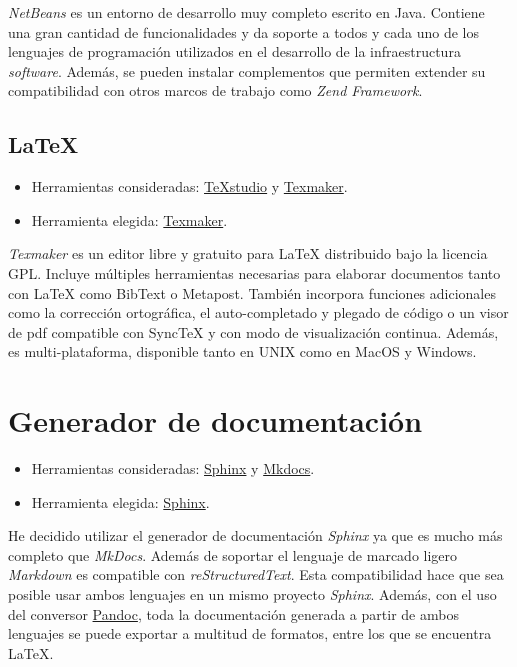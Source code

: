 \emph{NetBeans} es un entorno de desarrollo muy completo escrito en Java.
Contiene una gran cantidad de funcionalidades y da soporte a todos y
cada uno de los lenguajes de programación utilizados en el desarrollo de
la infraestructura \emph{software}. Además, se pueden instalar
complementos que permiten extender su compatibilidad con otros marcos de
trabajo como \emph{Zend Framework}.

\subsection{\LaTeX{}}

\begin{itemize}
\tightlist
\item
  Herramientas consideradas:
  \href{https://www.texstudio.org/}{TeXstudio} y
  \href{http://www.xm1math.net/texmaker/}{Texmaker}.
\item
  Herramienta elegida:
  \href{http://www.xm1math.net/texmaker/}{Texmaker}.
\end{itemize}

\emph{Texmaker} es un editor libre y gratuito para \LaTeX{} distribuido
bajo la licencia GPL. Incluye múltiples herramientas necesarias para
elaborar documentos tanto con \LaTeX{} como BibText o Metapost. También
incorpora funciones adicionales como la corrección ortográfica, el
auto-completado y plegado de código o un visor de pdf compatible con
SyncTeX y con modo de visualización continua. Además, es
multi-plataforma, disponible tanto en UNIX como en MacOS y Windows.

\section{Generador de documentación}

\begin{itemize}
\tightlist
\item
  Herramientas consideradas:
  \href{https://www.sphinx-doc.org/es/master/index.html}{Sphinx} y
  \href{https://www.mkdocs.org/}{Mkdocs}.
\item
  Herramienta elegida:
  \href{https://www.sphinx-doc.org/es/master/index.html}{Sphinx}.
\end{itemize}

He decidido utilizar el generador de documentación \emph{Sphinx} ya que
es mucho más completo que \emph{MkDocs}. Además de soportar el lenguaje
de marcado ligero \emph{Markdown} es compatible con
\emph{reStructuredText}. Esta compatibilidad hace que sea posible usar
ambos lenguajes en un mismo proyecto \emph{Sphinx}. Además, con el uso
del conversor \href{http://pandoc.org/}{Pandoc}, toda la documentación
generada a partir de ambos lenguajes se puede exportar a multitud de
formatos, entre los que se encuentra \LaTeX{}.

